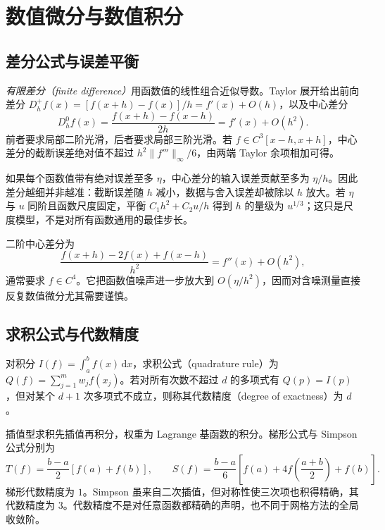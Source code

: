\setcounter{chapter}{8} %
\chapter{数值微分与数值积分}
\label{chap:na-quadrature}

\section{差分公式与误差平衡}
\emph{有限差分（finite difference）}用函数值的线性组合近似导数。Taylor 展开给出前向差分 $D_h^+f(x)=[f(x+h)-f(x)]/h=f'(x)+O(h)$，以及中心差分
\begin{equation}
 D_h^0f(x)=\frac{f(x+h)-f(x-h)}{2h}=f'(x)+O(h^2).
 \label{eq:na-central-difference}
\end{equation}
前者要求局部二阶光滑，后者要求局部三阶光滑。若 $f\in C^3[x-h,x+h]$，中心差分的截断误差绝对值不超过 $h^2\|f'''\|_\infty/6$，由两端 Taylor 余项相加可得。

如果每个函数值带有绝对误差至多 $\eta$，中心差分的输入误差贡献至多为 $\eta/h$。因此差分越细并非越准：截断误差随 $h$ 减小，数据与舍入误差却被除以 $h$ 放大。若 $\eta$ 与 $u$ 同阶且函数尺度固定，平衡 $C_1h^2+C_2u/h$ 得到 $h$ 的量级为 $u^{1/3}$；这只是尺度模型，不是对所有函数通用的最佳步长。

二阶中心差分为
\[
 \frac{f(x+h)-2f(x)+f(x-h)}{h^2}=f''(x)+O(h^2),
\]
通常要求 $f\in C^4$。它把函数值噪声进一步放大到 $O(\eta/h^2)$，因而对含噪测量直接反复数值微分尤其需要谨慎。

\section{求积公式与代数精度}
\begin{definition}[求积公式的代数精度]
对积分 $I(f)=\int_a^bf(x)\,\mathrm dx$，求积公式（quadrature rule）为 $Q(f)=\sum_{j=1}^m w_jf(x_j)$。若对所有次数不超过 $d$ 的多项式有 $Q(p)=I(p)$，但对某个 $d+1$ 次多项式不成立，则称其代数精度（degree of exactness）为 $d$。
\end{definition}
插值型求积先插值再积分，权重为 Lagrange 基函数的积分。梯形公式与 Simpson 公式分别为
\[
 T(f)=\frac{b-a}{2}[f(a)+f(b)],\qquad
 S(f)=\frac{b-a}{6}\left[f(a)+4f\left(\frac{a+b}{2}\right)+f(b)\right].
\]
梯形代数精度为 $1$。Simpson 虽来自二次插值，但对称性使三次项也积得精确，其代数精度为 $3$。代数精度不是对任意函数都精确的声明，也不同于网格方法的全局收敛阶。

